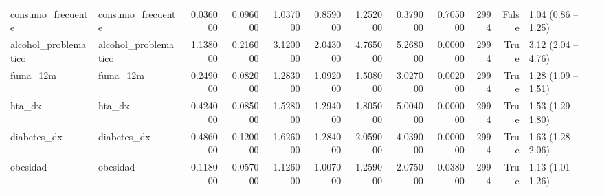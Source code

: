 \begin{table}[htbp]
\begin{tabular}{llrrrrrrrrrl}
consumo\_frecuente & consumo\_frecuente & 0.036000 & 0.096000 & 1.037000 & 0.859000 & 1.252000 & 0.379000 & 0.705000 & 2994 & False & 1.04 (0.86 – 1.25) \\
alcohol\_problematico & alcohol\_problematico & 1.138000 & 0.216000 & 3.120000 & 2.043000 & 4.765000 & 5.268000 & 0.000000 & 2994 & True & 3.12 (2.04 – 4.76) \\
fuma\_12m & fuma\_12m & 0.249000 & 0.082000 & 1.283000 & 1.092000 & 1.508000 & 3.027000 & 0.002000 & 2994 & True & 1.28 (1.09 – 1.51) \\
hta\_dx & hta\_dx & 0.424000 & 0.085000 & 1.528000 & 1.294000 & 1.805000 & 5.004000 & 0.000000 & 2994 & True & 1.53 (1.29 – 1.80) \\
diabetes\_dx & diabetes\_dx & 0.486000 & 0.120000 & 1.626000 & 1.284000 & 2.059000 & 4.039000 & 0.000000 & 2994 & True & 1.63 (1.28 – 2.06) \\
obesidad & obesidad & 0.118000 & 0.057000 & 1.126000 & 1.007000 & 1.259000 & 2.075000 & 0.038000 & 2994 & True & 1.13 (1.01 – 1.26) \\
\bottomrule
\end{tabular}
\end{table}
